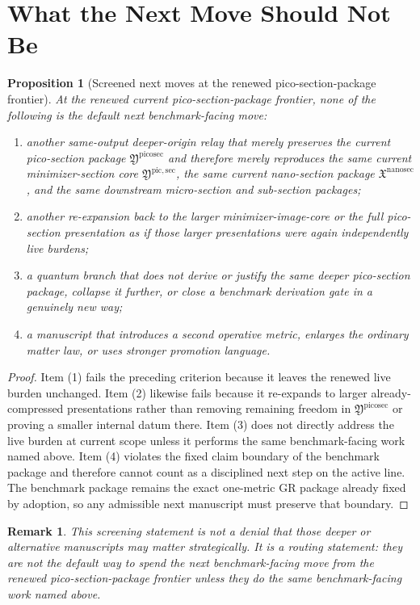 \documentclass[11pt]{article}
\newcommand{\NanoSectionPackage}{\mathfrak X^{\mathrm{nanosec}}}
\newcommand{\PicoSectionPackage}{\mathfrak Y^{\mathrm{picosec}}}
\newcommand{\PicoMinSectionCore}{\mathfrak Y^{\mathrm{pic,sec}}}
\newtheorem{proposition}{Proposition}
\newtheorem{remark}{Remark}
\begin{document}
\section{What the Next Move Should Not Be}

\begin{proposition}[Screened next moves at the renewed pico-section-package frontier]
At the renewed current pico-section-package frontier, none of the following is the default next benchmark-facing move:
\begin{enumerate}
    \item another same-output deeper-origin relay that merely preserves the current pico-section package \(\PicoSectionPackage\) and therefore merely reproduces the same current minimizer-section core \(\PicoMinSectionCore\), the same current nano-section package \(\NanoSectionPackage\), and the same downstream micro-section and sub-section packages;
    \item another re-expansion back to the larger minimizer-image-core or the full pico-section presentation as if those larger presentations were again independently live burdens;
    \item a quantum branch that does not derive or justify the same deeper pico-section package, collapse it further, or close a benchmark derivation gate in a genuinely new way;
    \item a manuscript that introduces a second operative metric, enlarges the ordinary matter law, or uses stronger promotion language.
\end{enumerate}
\end{proposition}

\begin{proof}
Item (1) fails the preceding criterion because it leaves the renewed live burden unchanged. Item (2) likewise fails because it re-expands to larger already-compressed presentations rather than removing remaining freedom in \(\PicoSectionPackage\) or proving a smaller internal datum there. Item (3) does not directly address the live burden at current scope unless it performs the same benchmark-facing work named above. Item (4) violates the fixed claim boundary of the benchmark package and therefore cannot count as a disciplined next step on the active line. The benchmark package remains the exact one-metric GR package already fixed by adoption, so any admissible next manuscript must preserve that boundary.
\end{proof}

\begin{remark}
This screening statement is not a denial that those deeper or alternative manuscripts may matter strategically. It is a routing statement: they are not the default way to spend the next benchmark-facing move from the renewed pico-section-package frontier unless they do the same benchmark-facing work named above.
\end{remark}
\end{document}
